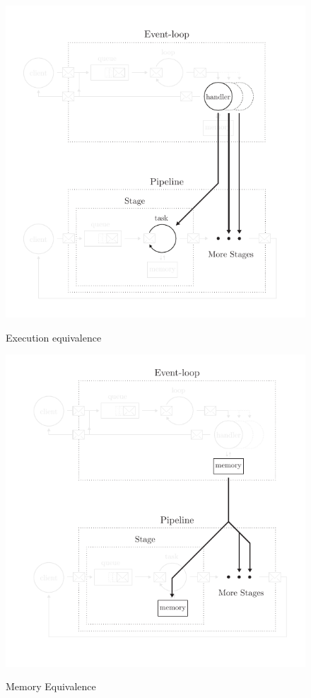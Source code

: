 \begin{figure}[h!]
  \centering
  \begin{minipage}{0.49\textwidth}
    \centering
    \includegraphics[width=\linewidth]{../resources/run-equivalence.pdf}
    \label{fig:run-equivalence}
    \caption{Execution equivalence}
  \end{minipage}
  \hfill
  \begin{minipage}{0.49\textwidth}
    \centering
    \includegraphics[width=\linewidth]{../resources/mem-equivalence.pdf}
    \label{fig:mem-equivalence}
    \caption{Memory Equivalence}
  \end{minipage}
\end{figure}


